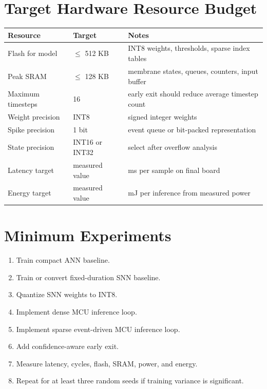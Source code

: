 \documentclass[11pt]{article}
\begin{document}
\section*{Target Hardware Resource Budget}
\begin{tabular}{lll}
\toprule
Resource & Target & Notes \\
\midrule
Flash for model & $\leq$ 512 KB & INT8 weights, thresholds, sparse index tables \\
Peak SRAM & $\leq$ 128 KB & membrane states, queues, counters, input buffer \\
Maximum timesteps & 16 & early exit should reduce average timestep count \\
Weight precision & INT8 & signed integer weights \\
Spike precision & 1 bit & event queue or bit-packed representation \\
State precision & INT16 or INT32 & select after overflow analysis \\
Latency target & measured value & ms per sample on final board \\
Energy target & measured value & mJ per inference from measured power \\
\bottomrule
\end{tabular}

\section*{Minimum Experiments}
\begin{enumerate}
    \item Train compact ANN baseline.
    \item Train or convert fixed-duration SNN baseline.
    \item Quantize SNN weights to INT8.
    \item Implement dense MCU inference loop.
    \item Implement sparse event-driven MCU inference loop.
    \item Add confidence-aware early exit.
    \item Measure latency, cycles, flash, SRAM, power, and energy.
    \item Repeat for at least three random seeds if training variance is significant.
\end{enumerate}
\end{document}
